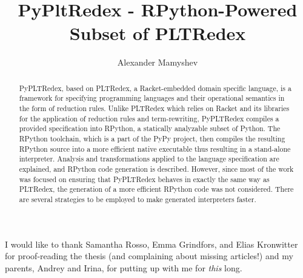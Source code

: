 \documentclass[mscthesis, 11pt]{usiinfthesis}
\title{PyPltRedex - RPython-Powered Subset of PLTRedex} %
\author{Alexander Mamyshev} %
\begin{document}
\maketitle %

\frontmatter %

\begin{abstract}
PyPLTRedex, based on PLTRedex, a Racket-embedded domain specific language, is a framework for specifying programming languages and their operational semantics in the form of reduction rules. Unlike PLTRedex which relies on Racket and its libraries for the application of reduction rules and term-rewriting, PyPLTRedex compiles a  provided specification into RPython, a statically analyzable subset of Python. The RPython toolchain, which is a part of the PyPy project, then compiles the resulting RPython source into a more efficient native executable thus resulting in a stand-alone interpreter. Analysis and transformations applied to the language specification are explained, and RPython code generation is described. However, since most of the work was focused on ensuring that PyPLTRedex behaves in exactly the same way as PLTRedex, the generation of a  more efficient RPython code was not considered. There are several strategies to be employed to make generated interpreters faster.
\end{abstract}


\begin{acknowledgements}
I would like to thank Samantha Rosso, Emma Grindfors, and Elias Kronwitter for proof-reading the thesis (and complaining about missing articles!) and my parents, Andrey and Irina, for putting up with me for \textit{this} long.
\end{acknowledgements}

\tableofcontents 

\mainmatter

%








%


\backmatter

%
%



\end{document}

